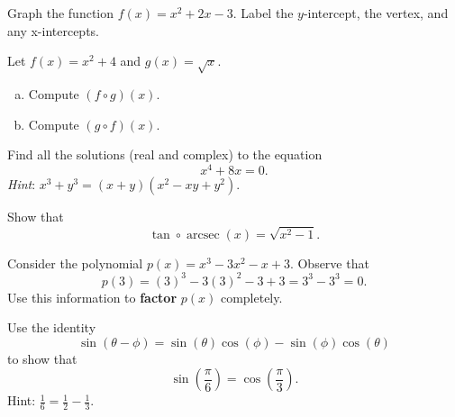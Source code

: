 \documentclass[12pt]{amsart}
\begin{document}
\newpage

\begin{thm}[4 Points]
	Graph the function $f(x) = x^2 + 2x - 3$.
	Label the $y$-intercept, the vertex, and any x-intercepts.
	\vspace{3.5in}
\end{thm}

\newpage

\begin{thm}[2 Points]\label{ex3}
  Let $f(x) = x^2 + 4$ and $g(x) = \sqrt{x}$.
  \begin{enumerate}[(a)]
  \item
    Compute $(f \circ g)(x)$.
    \vspace{2in}
  \item
    Compute $(g \circ f)(x)$.
    \vspace{2in}
  \end{enumerate}
\end{thm}

\newpage

\begin{thm}[10 Points]
	Find all the solutions (real and complex) to the equation 
	$$x^4 + 8x = 0.$$
        {\it Hint}: $x^3 + y^3 = (x + y)(x^2 - xy + y^2)$.
	\vspace{3in}
\end{thm}

\newpage

\begin{thm}[10 Points]
  Show that
  $$\tan \circ \operatorname{arcsec}(x) = \sqrt{x^2 - 1}.$$
\end{thm}

\newpage

\begin{thm}[10 Points]
	Consider the polynomial $p(x) = x^3 - 3x^2 - x + 3$.
	Observe that 
	$$p(3) = (3)^3 - 3(3)^2 - 3 + 3 = 3^3 - 3^3 = 0.$$
	Use this information to {\bf factor} $p(x)$ completely.
	\vspace{3.5in}
\end{thm}

\newpage

\begin{thm}[4 Points]
	Use the identity
        $$\sin(\theta - \phi) = \sin(\theta)\cos(\phi) - \sin(\phi)\cos(\theta)$$
	to show that
	$$\sin\left(\frac{\pi}{6}\right) = \cos\left(\frac{\pi}{3}\right).$$
        Hint: $\frac{1}{6} = \frac{1}{2} - \frac{1}{3}.$
\end{thm}

\newpage
\end{document}

